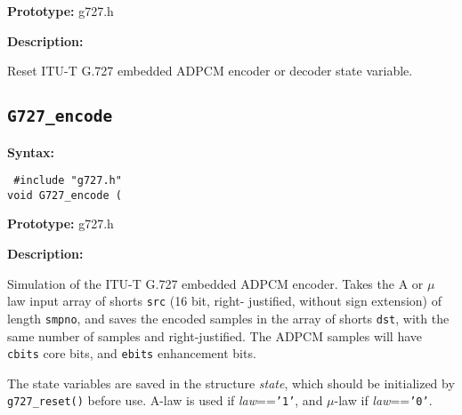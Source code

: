 {\bf Prototype: }    g727.h

{\bf Description: }

  Reset ITU-T G.727 embedded ADPCM encoder or decoder state variable.


\subsection{{\tt G727\_encode}}

{\bf Syntax: }

{\tt
\#include "g727.h"\\
void G727\_encode
         (
}

{\bf Prototype: }    g727.h

{\bf Description: }

Simulation of the ITU-T G.727 embedded ADPCM encoder. Takes the A or
$\mu$ law input array of shorts {\tt src} (16 bit, right- justified,
without sign extension) of length {\tt smpno}, and saves the encoded
samples in the array of shorts {\tt dst}, with the same number of
samples and right-justified. The ADPCM samples will have {\tt cbits}
core bits, and {\tt ebits} enhancement bits.

The state variables are saved in the structure {\em state}, which
should be initialized by {\tt g727\_reset()} before use. A-law is used
if {\em law}=={\tt '1'}, and $\mu$-law if {\em law}=={\tt '0'}.

